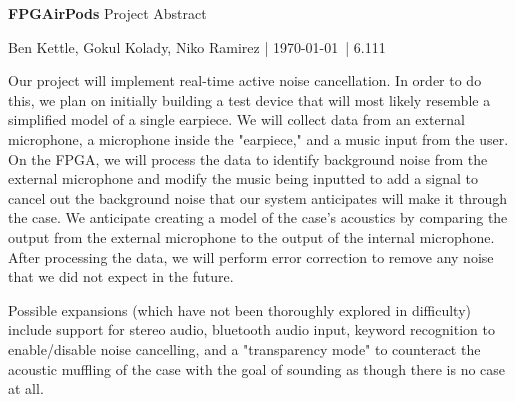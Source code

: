 \documentclass[12pt]{article}
\begin{document}
{\Huge \sffamily \textbf{FPGAirPods} Project Abstract}

\vspace{2mm}
{\sffamily Ben Kettle, Gokul Kolady, Niko Ramirez | \today \ | 6.111}
\vspace{5mm}

Our project will implement real-time active noise cancellation. In order to do this, we plan on initially building a test device that will most likely resemble a simplified model of a single earpiece. We will collect data from an external microphone, a microphone inside the "earpiece," and a music input from the user. On the FPGA, we will process the data to identify background noise from the external microphone and modify the music being inputted to add a signal to cancel out the background noise that our system anticipates will make it through the case. We anticipate creating a model of the case's acoustics by comparing the output from the external microphone to the output of the internal microphone. After processing the data, we will perform error correction to remove any noise that we did not expect in the future.  

Possible expansions (which have not been thoroughly explored in difficulty) include support for stereo audio, bluetooth audio input, keyword recognition to enable/disable noise cancelling, and a "transparency mode" to counteract the acoustic muffling of the case with the goal of sounding as though there is no case at all.
\end{document}
